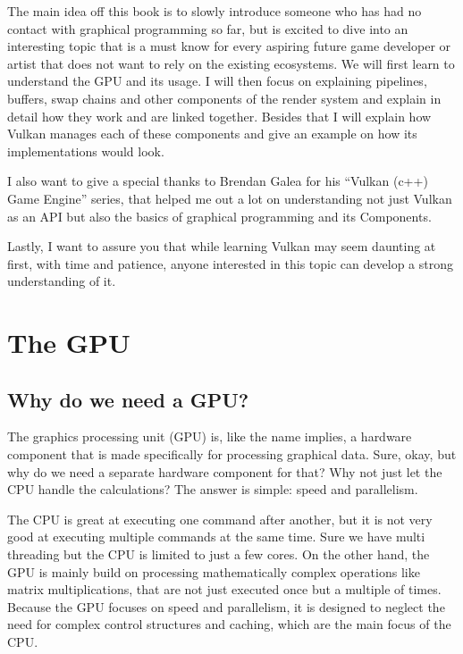 \documentclass[12pt]{report} \usepackage{preamble}
\begin{document}
The main idea off this book is to slowly introduce someone who has had
no contact with graphical programming so far, but is excited to dive
into an interesting topic that is a must know for every aspiring future
game developer or artist that does not want to rely on the existing
ecosystems. We will first learn to understand the GPU and its usage. I
will then focus on explaining pipelines, buffers, swap chains and other
components of the render system and explain in detail how they work
and are linked together. Besides that I will explain how Vulkan manages
each of these components and give an example on how its implementations
would look.

I also want to give a special thanks to Brendan Galea for his “Vulkan
(c++) Game Engine” series, that helped me out a lot on understanding
not just Vulkan as an API but also the basics of graphical programming
and its Components.

Lastly, I want to assure you that while learning Vulkan may seem daunting
at first, with time and patience, anyone interested in this topic can
develop a strong understanding of it.

\chapter{The GPU}

\section{Why do we need a GPU?}

The graphics processing unit (GPU) is, like the name implies, a hardware
component that is made specifically for processing graphical data. Sure,
okay, but why do we need a separate hardware component for that?  Why not
just let the CPU handle the calculations? The answer is simple: speed
and parallelism.

The CPU is great at executing one command after another, but
it is not very good at executing multiple commands at the same
time. Sure we have multi threading but the CPU is limited to just a
few cores. \cite{CDW-cpu_vs_gpu} On the other hand, the GPU is mainly
build on processing mathematically complex operations like matrix
multiplications, that are not just executed once but a multiple
of times. \cite{NVIDIA-cpu-gpu} Because the GPU focuses on speed
and parallelism, it is designed to neglect the need for complex
control structures and caching, which are the main focus of the
CPU. \cite{CUDA_Programming_Guide}
\end{document}

